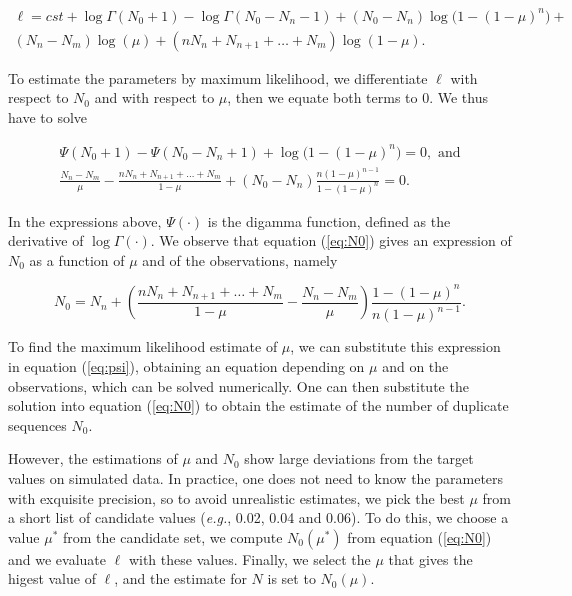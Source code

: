 \documentclass{article}
\begin{document}
\begin{equation}
\begin{split}
\ell = cst + \log \Gamma(N_0+1) - \log \Gamma(N_0-N_n-1)
+ (N_0-N_n) \log \big(1-(1-\mu)^n\big) + \\
(N_n-N_m) \log(\mu) + (nN_n + N_{n+1} + \ldots + N_m) \log(1-\mu).
\end{split}
\end{equation}

To estimate the parameters by maximum likelihood, we differentiate $\ell$
with respect to $N_0$ and with respect to $\mu$, then we equate both terms
to 0. We thus have to solve

\begin{gather}
\label{eq:psi}
\Psi(N_0+1)-\Psi(N_0-N_n+1) +
  \log\big( 1-(1-\mu)^n \big) = 0, \text{ and} \\
\label{eq:N0}
\frac{N_n-N_m}{\mu}
-\frac{nN_n + N_{n+1}+\ldots+N_m}{1-\mu} +
(N_0-N_n)\frac{n(1-\mu)^{n-1}}{1-(1-\mu)^n} = 0.
\end{gather}

In the expressions above, $\Psi(\cdot)$ is the digamma function, defined
as the derivative of $\log \Gamma(\cdot)$. We observe that equation
(\ref{eq:N0}) gives an expression of $N_0$ as a function of $\mu$ and of
the observations, namely

\begin{equation*}
N_0 = N_n +
\left(\frac{nN_n+N_{n+1}+\ldots+N_m}{1-\mu}-
\frac{N_n-N_m}{\mu} \right)
\frac{1-(1-\mu)^n}{n(1-\mu)^{n-1}}.
\end{equation*}

To find the maximum likelihood estimate of $\mu$, we can substitute this
expression in equation (\ref{eq:psi}), obtaining an equation depending on
$\mu$ and on the observations, which can be solved numerically. One can
then substitute the solution into equation (\ref{eq:N0}) to obtain the
estimate of the number of duplicate sequences $N_0$.

However, the estimations of $\mu$ and $N_0$ show large deviations from the
target values on simulated data. In practice, one does not need to know
the parameters with exquisite precision, so to avoid unrealistic
estimates, we pick the best $\mu$ from a short list of candidate values
(\textit{e.g.}, 0.02, 0.04 and 0.06). To do this, we choose a value
$\mu^*$ from the candidate set, we compute $N_0(\mu^*)$ from equation
(\ref{eq:N0}) and we evaluate $\ell$ with these values. Finally, we select
the $\mu$ that gives the higest value of $\ell$, and the estimate for
$N$ is set to $N_0(\mu)$.
\end{document}
